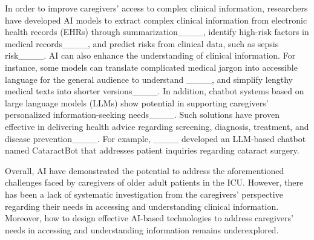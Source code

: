 In order to improve caregivers' access to complex clinical information, researchers have developed AI models to extract complex clinical information from electronic health records (EHRs) through summarization____, identify high-risk factors in medical records____, and predict risks from clinical data, such as sepsis risk____. 
AI can also enhance the understanding of clinical information.
For instance, some models can translate complicated medical jargon into accessible language for the general audience to understand ____, and simplify lengthy medical texts into shorter versions____. In addition, chatbot systems based on large language models (LLMs) show potential in supporting caregivers' personalized information-seeking needs____. 
Such solutions have proven effective in delivering health advice regarding screening, diagnosis, treatment, and disease prevention____. 
For example, ____ developed an LLM-based chatbot named CataractBot that addresses patient inquiries regarding cataract surgery.

Overall, AI have demonstrated the potential to address the aforementioned challenges faced by caregivers of older adult patients in the ICU. 
However, there has been a lack of systematic investigation from the caregivers' perspective regarding their needs in accessing and understanding clinical information.
Moreover, how to design effective AI-based technologies to address caregivers' needs in accessing and understanding information remains underexplored.






